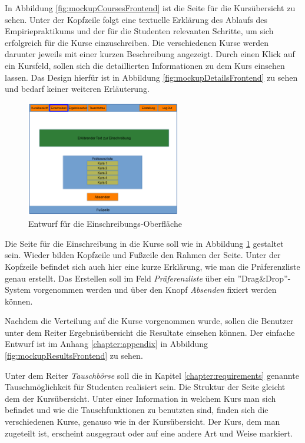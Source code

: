 			In Abbildung \ref{fig:mockupCoursesFrontend} ist die Seite für die Kursübersicht zu sehen.
            Unter der Kopfzeile folgt eine textuelle Erklärung des Ablaufs des Empiriepraktikums und der für die Studenten relevanten Schritte, um sich erfolgreich für die Kurse einzuschreiben.
            Die verschiedenen Kurse werden darunter jeweils mit einer kurzen Beschreibung angezeigt.
            Durch einen Klick auf ein Kursfeld, sollen sich die detaillierten Informationen zu dem Kurs einsehen lassen.
            Das Design hierfür ist in Abbildung \ref{fig:mockupDetailsFrontend} zu sehen und bedarf keiner weiteren Erläuterung.
            
            \begin{figure}[t]
            	\centering
            	\includegraphics[width=0.6\textwidth]{./design/images/MockUpsFrontend/frontendPreferences.png}
            	\caption{Entwurf für die Einschreibungs-Oberfläche}
            	\label{fig:mockupPreferencesFrontend}
            \end{figure}
            
            Die Seite für die Einschreibung in die Kurse soll wie in Abbildung \ref{fig:mockupPreferencesFrontend} gestaltet sein.
            Wieder bilden Kopfzeile und Fußzeile den Rahmen der Seite.
            Unter der Kopfzeile befindet sich auch hier eine kurze Erklärung, wie man die Präferenzliste genau erstellt.
            Das Erstellen soll im Feld \textit{Präferenzliste} über ein ''Drag\&Drop''-System vorgenommen werden und über den Knopf \textit{Absenden} fixiert werden können.
            
            Nachdem die Verteilung auf die Kurse vorgenommen wurde, sollen die Benutzer unter dem Reiter Ergebnisübersicht die Resultate einsehen können.
            Der einfache Entwurf ist im Anhang \ref{chapter:appendix} in Abbildung \ref{fig:mockupResultsFrontend} zu sehen.
            
            Unter dem Reiter \textit{Tauschbörse} soll die in Kapitel \ref{chapter:requirements} genannte Tauschmöglichkeit für Studenten realisiert sein.
            Die Struktur der Seite gleicht dem der Kursübersicht.
            Unter einer Information in welchem Kurs man sich befindet und wie die Tauschfunktionen zu benutzten sind, finden sich die verschiedenen Kurse, genauso wie in der Kursübersicht.
            Der Kurs, dem man zugeteilt ist, erscheint ausgegraut oder auf eine andere Art und Weise markiert.
            
